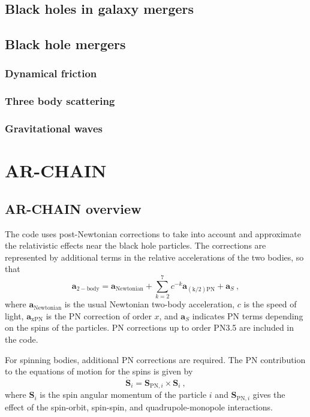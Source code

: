 \documentclass[english, oneside]{HYgradu}
\begin{document}
\section{Black holes in galaxy mergers}

\section{Black hole mergers}
\subsection{Dynamical friction}
\subsection{Three body scattering}
\subsection{Gravitational waves}

\chapter{AR-CHAIN}
\section{AR-CHAIN overview}

The code uses post-Newtonian corrections to take into account and approximate the relativistic effects near the black hole particles. The corrections are represented by additional terms in the relative accelerations of the two bodies, so that
\begin{equation}
\boldsymbol{a}_\mathrm{2-body} = \boldsymbol{a}_\mathrm{Newtonian} + \sum_{k=2}^7 c^{-k} \boldsymbol{a}_\mathrm{(k/2)PN} + \boldsymbol{a}_S \ ,
\end{equation}
where $\boldsymbol{a}_\mathrm{Newtonian}$ is the usual Newtonian two-body acceleration, $c$ is the speed of light, $\boldsymbol{a}_\mathrm{xPN}$ is the PN correction of order $x$, and $\boldsymbol{a}_S$ indicates PN terms depending on the spins of the particles. PN corrections up to order PN3.5 are included in the code.

For spinning bodies, additional PN corrections are required. The PN contribution to the equations of motion for the spins is given by
\begin{equation}
\boldsymbol{\dot{S}}_i = \boldsymbol{S}_{\mathrm{PN},i} \times \boldsymbol{S}_i \ ,
\end{equation}
where $\boldsymbol{S}_i$ is the spin angular momentum of the particle $i$ and $\boldsymbol{S}_{\mathrm{PN},i}$ gives the effect of the spin-orbit, spin-spin, and quadrupole-monopole interactions. %
\end{document}
